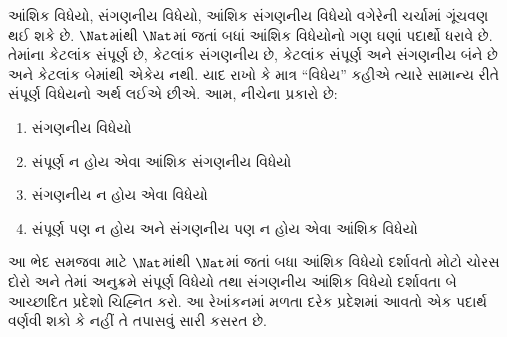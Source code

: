 \documentclass[../../../include/open-logic-section]{subfiles}
\begin{document}
આંશિક વિધેયો, સંગણનીય વિધેયો, આંશિક સંગણનીય વિધેયો વગેરેની
ચર્ચામાં ગૂંચવણ થઈ શકે છે. $\Nat$માંથી $\Nat$માં જતાં બધાં
આંશિક વિધેયોનો ગણ ઘણાં પદાર્થો ધરાવે છે. તેમાંના કેટલાંક સંપૂર્ણ
છે, કેટલાંક સંગણનીય છે, કેટલાંક સંપૂર્ણ અને સંગણનીય બંને છે અને
કેટલાંક બેમાંથી એકેય નથી. યાદ રાખો કે માત્ર ``વિધેય'' કહીએ ત્યારે
સામાન્ય રીતે સંપૂર્ણ વિધેયનો અર્થ લઈએ છીએ. આમ, નીચેના પ્રકારો છે:
\begin{enumerate}
\item સંગણનીય વિધેયો
\item સંપૂર્ણ ન હોય એવા આંશિક સંગણનીય વિધેયો
\item સંગણનીય ન હોય એવા વિધેયો
\item સંપૂર્ણ પણ ન હોય અને સંગણનીય પણ ન હોય એવા આંશિક વિધેયો
\end{enumerate}
આ ભેદ સમજવા માટે $\Nat$માંથી $\Nat$માં જતાં બધા આંશિક વિધેયો
દર્શાવતો મોટો ચોરસ દોરો અને તેમાં અનુક્રમે સંપૂર્ણ વિધેયો તથા
સંગણનીય આંશિક વિધેયો દર્શાવતા બે આચ્છાદિત પ્રદેશો ચિહ્નિત કરો.
આ રેખાંકનમાં મળતા દરેક પ્રદેશમાં આવતો એક પદાર્થ વર્ણવી શકો કે
નહીં તે તપાસવું સારી કસરત છે.
\end{document}
